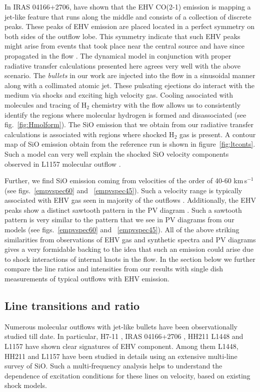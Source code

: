 \documentclass[useAMS,usenatbib,letters]{mn2e}
\begin{document}
In IRAS 04166+2706, \cite{SantiagoGarcia:2009p13972} have shown 
that the EHV CO(2-1) emission is mapping a jet-like
feature that runs along the middle and consists of a collection of
discrete peaks. These peaks of EHV emission are placed located in a
perfect symmetry on both sides of the outflow lobe. This symmetry
indicate that such EHV peaks might arise from events that took place
near the central source and have since propagated in the flow
\cite{Bachiller:1990p11196, Tafalla:2011p14051}. The dynamical 
model in conjunction with proper radiative transfer calculations presented here 
agrees very well with the above scenario. The {\em{bullets}} in our
work are injected into the flow in a sinusoidal manner along with a
collimated atomic jet. These pulsating ejections do interact with the medium
via shocks and exciting high velocity gas. Cooling associated with
molecules and tracing of H$_{2}$ chemistry with the flow allows us to
consistently identify the regions where molecular hydrogen is formed
and disassociated (see fig.~\ref{fig:Hmolform}). The SiO emission that we
obtain from our radiative transfer calculations is associated with
regions where shocked H$_{2}$ gas is present. A contour map of SiO
emission obtain from the reference run is shown in
figure~\ref{fig:ltconts}. Such a model can very well explain the
shocked SiO velocity components observed in L1157 molecular outflow \cite{Gueth:1998p14058}. 
%
 
Further, we find SiO emission coming from velocities 
of the order of 40-60 km\,s$^{-1}$ (see figs.~\ref{empvspec60} and
~\ref{empvspec45}). Such a velocity range is typically associated with
EHV gas seen in majority of the outflows \cite{Tafalla:2011p14051}. Additionally,
the EHV peaks show a distinct sawtooth pattern in the PV diagram
\cite{SantiagoGarcia:2009p13972}. Such a sawtooth pattern is very
similar to the pattern that we see in PV diagrams from
our models (see figs.~\ref{empvspec60} and ~\ref{empvspec45}). 
All of the above striking similarities from observations of EHV gas
and synthetic spectra and PV diagrams gives a very formidable backing
to the idea that such an emission could arise due to shock interactions of
internal knots in the flow. In the section below we further compare
the line ratios and intensities from our results with single dish
measurements of typical outflows with EHV emission.

\subsection{Line transitions and ratio}
Numerous molecular outflows with jet-like bullets have been
observationally studied till date. In particular, H7-11
\citep{Bachiller:1998p14725}, IRAS 04166+2706
\citep{SantiagoGarcia:2009p13972, Tafalla:2010p14759}, HH211 \citep{Nisini:2002p14418}
L1448 \citep{Bachiller:1991p14732,Nisini:2007p13128,
  Tafalla:2010p14759} and L1157 \citep{Nisini:2007p13128} have
shown clear signatures of EHV component. Among them L1448, HH211 and
L1157 have been studied in details using an extensive multi-line
survey of SiO. Such a multi-frequency analysis helps to understand the dependence of
excitation conditions for these lines on velocity, based on existing shock
models.  
%
\end{document}
